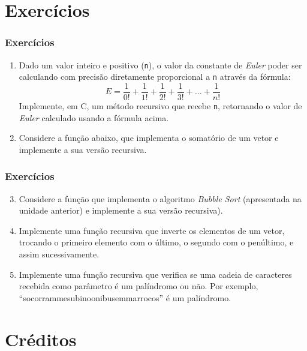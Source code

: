 \documentclass[aspectratio=169]{beamer}
\begin{document}
\section{Exercícios}

\begin{frame}\frametitle{Exercícios}
\begin{enumerate}
	\item Dado um valor inteiro e positivo (\texttt{n}), o valor da constante de \emph{Euler} poder ser calculando com precisão diretamente proporcional a \texttt{n} através da fórmula:
\[ E = \frac{1}{0!} + \frac{1}{1!} + \frac{1}{2!}+ \frac{1}{3!} + ... + \frac{1}{n!}\]
Implemente, em C, um método recursivo que recebe \texttt{n}, retornando o valor de \emph{Euler} calculado usando a fórmula acima.
	\item Considere a função abaixo, que implementa o somatório de um vetor e implemente a sua versão recursiva.

\end{enumerate}
\end{frame}

\begin{frame}\frametitle{Exercícios}
\begin{enumerate}
        \setcounter{enumi}{2}
	\item Considere a função que implementa o algoritmo \emph{Bubble Sort} (apresentada na unidade anterior) e implemente a sua versão recursiva).
	\item Implemente uma função recursiva que inverte os elementos de um vetor, trocando o primeiro elemento com o último, o segundo com o penúltimo, e assim sucessivamente.
	\item Implemente uma função recursiva que verifica se uma cadeia de caracteres recebida como parâmetro é um palíndromo ou não. Por exemplo, ``socorrammesubinoonibusemmarrocos'' é um palíndromo.
\end{enumerate}
\end{frame}

\section{Créditos}
\end{document}
